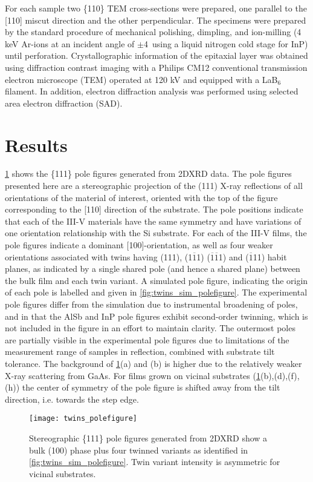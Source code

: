For each sample two \{110\} TEM cross-sections were prepared, one parallel to the [110] miscut direction and the other perpendicular. The specimens were prepared by the standard procedure of mechanical polishing, dimpling, and ion-milling (4 keV Ar-ions at an incident angle of $\pm$4\degree~using a liquid nitrogen cold stage for InP) until perforation. Crystallographic information of the epitaxial layer was obtained using diffraction contrast imaging with a Philips CM12 conventional transmission electron microscope (TEM) operated at 120 kV and equipped with a LaB$_6$ filament. In addition, electron diffraction analysis was performed using selected area electron diffraction (SAD).
\section{Results}
\cref{fig:twins_polefigure} shows the \{111\} pole figures generated from 2DXRD data. The pole figures presented here are a stereographic projection of the (111) X-ray reflections of all orientations of the material of interest, oriented with the top of the figure corresponding to the [110] direction of the substrate. The pole positions indicate that each of the III-V materials have the same symmetry and have variations of one orientation relationship with the Si substrate. For each of the III-V films, the pole figures indicate a dominant [100]-orientation, as well as four weaker orientations associated with twins having (111), (1$\overline{1}$1) ($\overline{1}\overline{1}$1) and ($\overline{1}$11) habit planes, as indicated by a single shared pole (and hence a shared plane) between the bulk film and each twin variant. A simulated pole figure, indicating the origin of each pole is labelled and given in \cref{fig:twins_sim_polefigure}. The experimental pole figures differ from the simulation due to instrumental broadening of poles, and in that the AlSb and InP pole figures exhibit second-order twinning, which is not included in the figure in an effort to maintain clarity. The outermost poles are partially visible in the experimental pole figures due to limitations of the measurement range of samples in reflection, combined with substrate tilt tolerance. The background of \cref{fig:twins_polefigure}(a) and (b) is higher due to the relatively weaker X-ray scattering from GaAs. For films grown on vicinal substrates (\cref{fig:twins_polefigure}(b),(d),(f),(h)) the center of symmetry of the pole figure is shifted away from the tilt direction, i.e. towards the step edge.
\begin{figure}
    \centering
    \texttt{[image: twins\_polefigure]}
    \caption[Pole figures of nominal and vicinal substrates]{\label{fig:twins_polefigure}Stereographic \{111\} pole figures generated from 2DXRD show a bulk (100) phase plus four twinned variants as identified in \cref{fig:twins_sim_polefigure}. Twin variant intensity is asymmetric for vicinal substrates.}
\end{figure}
